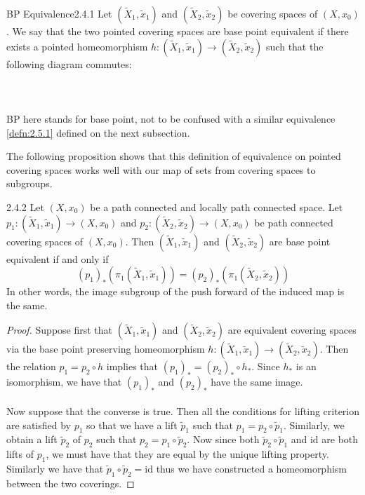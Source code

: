 \documentclass[a4paper]{article}
\begin{document}
\begin{defn}{BP Equivalence}{2.4.1} Let $(\tilde{X}_1,\tilde{x}_1)$ and $(\tilde{X}_2,\tilde{x}_2)$ be covering spaces of $(X,x_0)$. We say that the two pointed covering spaces are base point equivalent if there exists a pointed homeomorphism $h:(\tilde{X}_1,\tilde{x}_1)\to(\tilde{X}_2,\tilde{x}_2)$ such that the following diagram commutes: \\~\\
\\~\\
BP here stands for base point, not to be confused with a similar equivalence \ref{defn:2.5.1} defined on the next subsection. 
\end{defn}

The following proposition shows that this definition of equivalence on pointed covering spaces works well with our map of sets from covering spaces to subgroups. 

\begin{prp}{}{2.4.2} Let $(X,x_0)$ be a path connected and locally path connected space. Let $p_1:(\tilde{X}_1,\tilde{x}_1)\to(X,x_0)$ and $p_2:(\tilde{X}_2,\tilde{x}_2)\to(X,x_0)$ be path connected covering spaces of $(X,x_0)$. Then $(\tilde{X}_1,\tilde{x}_1)$ and $(\tilde{X}_2,\tilde{x}_2)$ are base point equivalent if and only if $$(p_1)_\ast\left(\pi_1(\tilde{X}_1,\tilde{x}_1)\right)=(p_2)_\ast\left(\pi_1(\tilde{X}_2,\tilde{x}_2)\right)$$ In other words, the image subgroup of the push forward of the induced map is the same. \tcbline
\begin{proof}
Suppose first that $(\tilde{X}_1,\tilde{x}_1)$ and $(\tilde{X}_2,\tilde{x}_2)$ are equivalent covering spaces via the base point preserving homeomorphism $h:(\tilde{X}_1,\tilde{x}_1)\to(\tilde{X}_2,\tilde{x}_2)$. Then the relation $p_1=p_2\circ h$ implies that $(p_1)_\ast=(p_2)_\ast\circ h_\ast$. Since $h_\ast$ is an isomorphism, we have that $(p_1)_\ast$ and $(p_2)_\ast$ have the same image. \\~\\

Now suppose that the converse is true. Then all the conditions for lifting criterion are satisfied by $p_1$ so that we have a lift $\tilde{p}_1$ such that $p_1=p_2\circ\tilde{p}_1$. Similarly, we obtain a lift $\tilde{p}_2$ of $p_2$ such that $p_2=p_1\circ\tilde{p}_2$. Now since both $\tilde{p}_2\circ\tilde{p}_1$ and $\text{id}$ are both lifts of $p_1$, we must have that they are equal by the unique lifting property. Similarly we have that $\tilde{p}_1\circ\tilde{p}_2=\text{id}$ thus we have constructed a homeomorphism between the two coverings. 
\end{proof}
\end{prp}
\end{document}
